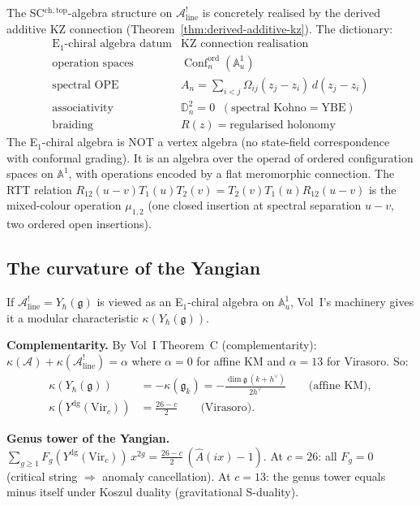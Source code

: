 \documentclass[11pt]{article}
\newcommand{\cA}{\mathcal{A}}
\newcommand{\fg}{\mathfrak{g}}
\DeclareMathOperator{\Conf}{Conf}
\begin{document}
The SC${}^{\mathrm{ch,top}}$-algebra structure on
$\cA^!_{\mathrm{line}}$ is concretely realised by the
derived additive KZ connection
(Theorem~\ref{thm:derived-additive-kz}).  The dictionary:
\[
\begin{array}{c|c}
\text{E}_1\text{-chiral algebra datum} &
  \text{KZ connection realisation} \\
\hline
\text{operation spaces} &
  \Conf_n^{\mathrm{ord}}(\mathbb{A}^1_u) \\
\text{spectral OPE} &
  A_n = \sum_{i<j}\Omega_{ij}(z_j - z_i)\,d(z_j - z_i) \\
\text{associativity} &
  \mathbb{D}_n^2 = 0
  \;\;(\text{spectral Kohno} = \text{YBE}) \\
\text{braiding} &
  R(z) = \text{regularised holonomy}
\end{array}
\]
The E$_1$-chiral algebra is NOT a vertex algebra (no
state-field correspondence with conformal grading).  It is an
algebra over the operad of ordered configuration spaces on
$\mathbb{A}^1$, with operations encoded by a flat meromorphic
connection.  The RTT relation $R_{12}(u-v)T_1(u)T_2(v) =
T_2(v)T_1(u)R_{12}(u-v)$ is the mixed-colour operation
$\mu_{1,2}$ (one closed insertion at spectral separation $u-v$,
two ordered open insertions).


\subsection{The curvature of the Yangian}

If $\cA^!_{\mathrm{line}} = Y_\hbar(\fg)$ is viewed as an
E$_1$-chiral algebra on $\mathbb{A}^1_u$, Vol~I's machinery
gives it a modular characteristic
$\kappa(Y_\hbar(\fg))$.

\medskip\noindent\textbf{Complementarity.}\enspace
By Vol~I Theorem~C (complementarity):
$\kappa(\cA) + \kappa(\cA^!_{\mathrm{line}}) = \alpha$
where $\alpha = 0$ for affine KM and $\alpha = 13$ for
Virasoro.  So:
\begin{align*}
\kappa(Y_\hbar(\fg))
&= -\kappa(\widehat{\fg}_k)
= -\frac{\dim\fg\,(k+h^\vee)}{2h^\vee}
\qquad\text{(affine KM)}, \\
\kappa(Y^{\mathrm{dg}}(\mathrm{Vir}_c))
&= \frac{26-c}{2}
\qquad\text{(Virasoro)}.
\end{align*}

\medskip\noindent\textbf{Genus tower of the Yangian.}\enspace
$\sum_{g \ge 1} F_g(Y^{\mathrm{dg}}(\mathrm{Vir}_c))\,x^{2g}
= \frac{26-c}{2}\,(\hat{A}(ix) - 1)$.
At $c = 26$: all $F_g = 0$ (critical string $\Rightarrow$
anomaly cancellation).  At $c = 13$: the genus tower equals
minus itself under Koszul duality (gravitational S-duality).
\end{document}
